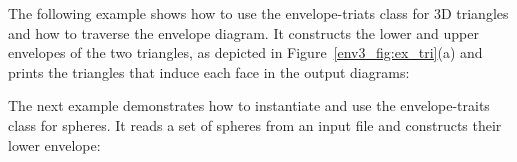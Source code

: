 The following example shows how to use the envelope-triats class
for 3D triangles and how to traverse the envelope diagram. It
constructs the lower and upper envelopes of the two triangles,
as depicted in Figure~\ref{env3_fig:ex_tri}(a) and prints the
triangles that induce each face in the output diagrams:


The next example demonstrates how to instantiate and use the
envelope-traits class for spheres. It reads a set of spheres
from an input file and constructs their lower envelope:


